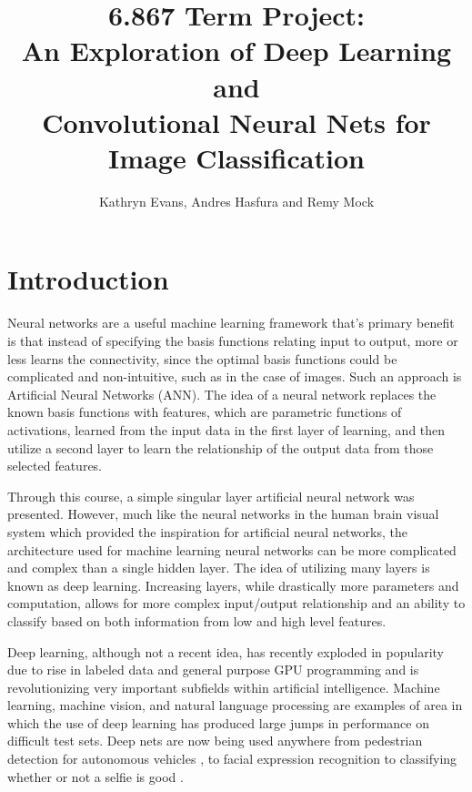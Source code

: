 \documentclass[12pt, twocolumn]{article}
\begin{document}
\title{ 6.867 Term Project: \\ An Exploration of Deep Learning and \\ Convolutional Neural Nets for Image Classification\\ }
 \author{Kathryn Evans, Andres Hasfura and Remy Mock}
\maketitle

\section{ Introduction} 
Neural networks are a useful machine learning framework that's primary benefit is that instead of specifying the basis functions relating input to output,  more or less learns the connectivity, since the optimal basis functions could be complicated and non-intuitive, such as in the case of images. Such an approach is Artificial Neural Networks (ANN). The idea of a neural network replaces the known basis functions with features, which are parametric functions of activations, learned from the input data in the first layer of learning, and then utilize a second layer to learn the relationship of the output data from those selected features.

Through this course, a simple singular layer artificial neural network was presented. However, much like the neural networks in the human brain visual system which provided the inspiration for artificial neural networks, the architecture used for machine learning neural networks can be more complicated and complex than a single hidden layer. The idea of utilizing many layers is known as deep learning.  Increasing layers, while drastically more parameters and computation,  allows for more complex input/output relationship and an ability to classify based on both information from low and high level features.

Deep learning, although not a recent idea, has recently exploded in popularity due to rise in labeled data and general purpose GPU programming and is revolutionizing very important subfields within artificial intelligence. Machine learning, machine vision, and natural language processing are examples of area in which the use of deep learning has produced large jumps in performance on difficult test sets. Deep nets are now being used anywhere from pedestrian detection for autonomous vehicles \cite{Szarvas2006}, to facial expression recognition \cite{Li2015} to classifying whether or not a selfie is good \cite{Karpathy}. 
	
\end{document}
